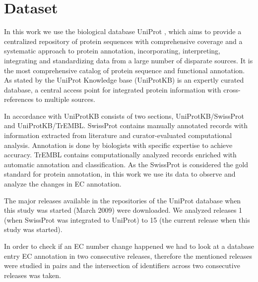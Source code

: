 \section{Dataset}
\label{sec:dataset}

In this work we use the biological database UniProt \cite{uniprot2012reorganizing}, which aims to provide a centralized repository of protein sequences with comprehensive coverage and a systematic approach to protein annotation, incorporating, interpreting, integrating and standardizing data from a large number of disparate sources. It is the most comprehensive catalog of protein sequence and functional annotation. As stated by \cite{uniprot2012reorganizing} the UniProt Knowledge base (UniProtKB) is an expertly curated database, a central access point for integrated protein information with cross-references to multiple sources. 
%

In accordance with \cite{apweiler2010universal} UniProtKB consists of two sections, UniProtKB/SwissProt and UniProtKB/TrEMBL. SwissProt contains manually annotated records with information extracted from literature and curator-evaluated computational analysis. Annotation is done by biologists with specific expertise to achieve accuracy. TrEMBL contains computationally analyzed records enriched with automatic annotation and classification. As the SwissProt is considered the gold standard for protein annotation, in this work we use its data to observe and analyze the changes in EC annotation.

The major releases available in the repositories of the UniProt database when this study was started (March 2009) were downloaded. We analyzed releases 1 (when SwissProt was integrated to UniProt) to 15 (the current release when this study was started). 

In order to check if an EC number change happened we had to look at a database entry EC annotation in two consecutive releases, therefore the mentioned releases were studied in pairs and the intersection of identifiers across two consecutive releases was taken.

